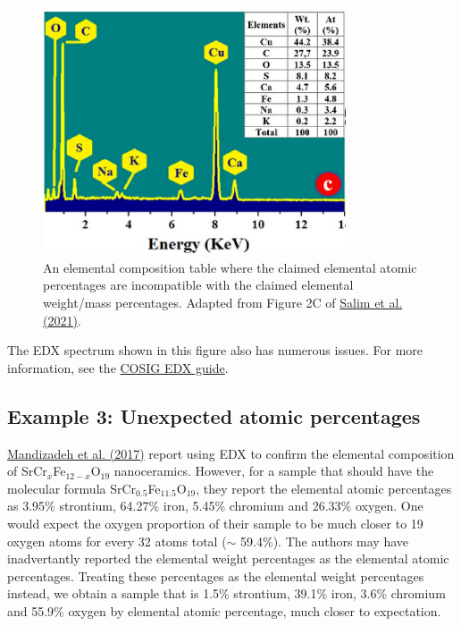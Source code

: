 \documentclass[letterpaper, 12pt]{article}
\begin{document}
\begin{figure}[h!tbp]
    \centering
    \includegraphics[width=0.8\textwidth]{img/elemental_composition/salim_table.png}
    \caption*{An elemental composition table where the claimed elemental atomic percentages are incompatible with the claimed elemental weight/mass percentages. Adapted from Figure 2C of \href{https://doi.org/10.1016/j.photonics.2020.100889}{Salim et al. (2021)}.}
\end{figure}

The EDX spectrum shown in this figure also has numerous issues. For more information, see the \href{https://osf.io/shfjy}{COSIG EDX guide}.

\subsection*{Example 3: Unexpected atomic percentages}

\href{https://doi.org/10.1371/journal.pone.0162891}{Mandizadeh et al. (2017)} report using EDX to confirm the elemental composition of SrCr$_x$Fe$_{12-x}$O$_{19}$ nanoceramics. However, for a sample that should have the molecular formula SrCr$_{0.5}$Fe$_{11.5}$O$_{19}$, they report the elemental atomic percentages as 3.95\% strontium, 64.27\% iron, 5.45\% chromium and 26.33\% oxygen. One would expect the oxygen proportion of their sample to be much closer to 19 oxygen atoms for every 32 atoms total ($\sim$ 59.4\%). The authors may have inadvertantly reported the elemental weight percentages as the elemental atomic percentages. Treating these percentages as the elemental weight percentages instead, we obtain a sample that is 1.5\% strontium, 39.1\% iron, 3.6\% chromium and 55.9\% oxygen by elemental atomic percentage, much closer to expectation.
\end{document}
